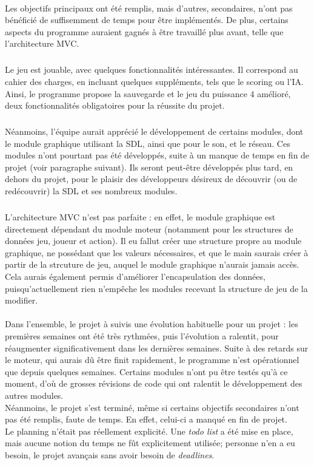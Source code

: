 \documentclass{report}
\begin{document}
    \paragraph*{} %
    Les objectifs principaux ont été remplis, mais d'autres, secondaires, n'ont pas bénéficié de suffisemment de temps pour être implémentés. De plus, certains aspects du programme 
        auraient gagnés à être travaillé plus avant, telle que l'architecture MVC.
        \subparagraph*{} %
        Le jeu est jouable, avec quelques fonctionnalités intéressantes. Il correspond au cahier des charges, en incluant quelques suppléments, tels que le scoring ou l'IA.
        Ainsi, le programme propose la sauvegarde et le jeu du puissance 4 amélioré, deux fonctionnalités obligatoires pour la réussite du projet.
        \subparagraph*{} %
        Néanmoins, l'équipe aurait apprécié le développement de certains modules, dont le module graphique utilisant la SDL, ainsi que pour le son, et le réseau. Ces modules n'ont 
            pourtant pas été développés, suite à un manque de temps en fin de projet (voir paragraphe suivant). Ils seront peut-être développés plus tard, en dehors du projet, 
            pour le plaisir des développeurs désireux de découvrir (ou de redécouvrir) la SDL et ses nombreux modules.
        \subparagraph*{} %
        L'architecture MVC n'est pas parfaite : en effet, le module graphique est directement dépendant du module moteur (notamment pour les structures de données jeu, joueur et action).
        Il eu fallut créer une structure propre au module graphique, ne possédant que les valeurs nécessaires, et que le main saurais créer à partir de la strcuture de jeu, auquel le
            module graphique n'aurais jamais accès. \\
        Cela aurais également permis d'améliorer l'encapsulation des données, puisqu'actuellement rien n'empêche les modules recevant la structure de jeu de la modifier.
    \newpage
    \paragraph*{} %
    Dans l'ensemble, le projet à suivis une évolution habituelle pour un projet : les premières semaines ont été très rythmées, puis l'évolution a ralentit, 
        pour réaugmenter significativement dans les dernières semaines. Suite à des retards sur le moteur, qui aurais dû être finit rapidement, le programme n'est opérationnel que depuis
        quelques semaines. Certains modules n'ont pu être testés qu'à ce moment, d'où de grosses révisions de code qui ont ralentit le développement des autres modules. \\
        Néanmoins, le projet s'est terminé, même si certains objectifs secondaires n'ont pas été remplis, faute de temps. En effet, celui-ci a manqué en fin de projet. \\
        Le planning n'était pas réellement explicité. Une \textit{todo list} a été mise en place, mais aucune notion du temps ne fût explicitement utilisée; personne n'en a eu besoin, 
        le projet avançais sans avoir besoin de \textit{deadlines}. 
\end{document}
